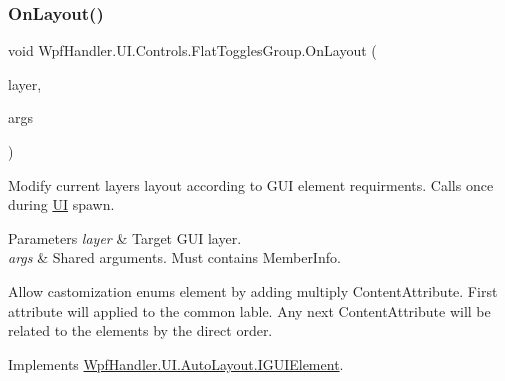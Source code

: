 \mbox{\label{class_wpf_handler_1_1_u_i_1_1_controls_1_1_flat_toggles_group_a5619e5107d6cbc3fb2cdabb21deb40a4}} 
\subsubsection{\texorpdfstring{On\+Layout()}{OnLayout()}}
{\footnotesize\ttfamily void Wpf\+Handler.\+U\+I.\+Controls.\+Flat\+Toggles\+Group.\+On\+Layout (\begin{DoxyParamCaption}\item[{ref \mbox{\hyperlink{class_wpf_handler_1_1_u_i_1_1_auto_layout_1_1_layout_layer}{Layout\+Layer}}}]{layer,  }\item[{params object \mbox{[}$\,$\mbox{]}}]{args }\end{DoxyParamCaption})}



Modify current layer\textquotesingle{}s layout according to G\+UI element requirments. Calls once during \mbox{\hyperlink{namespace_wpf_handler_1_1_u_i}{UI}} spawn. 


\begin{DoxyParams}{Parameters}
{\em layer} & Target G\+UI layer.\\
\hline
{\em args} & Shared arguments. Must contains Member\+Info.\\
\hline
\end{DoxyParams}


Allow castomization enum\textquotesingle{}s element by adding multiply Content\+Attribute. First attribute will applied to the common lable. Any next Content\+Attribute will be related to the elements by the direct order. 

Implements \mbox{\hyperlink{interface_wpf_handler_1_1_u_i_1_1_auto_layout_1_1_i_g_u_i_element_a0ff16956f8e8187d51e1b36b6b9f894e}{Wpf\+Handler.\+U\+I.\+Auto\+Layout.\+I\+G\+U\+I\+Element}}.

\mbox{\label{class_wpf_handler_1_1_u_i_1_1_controls_1_1_flat_toggles_group_a614b0a059caad9bc0704342bae1bb7f5}} 
